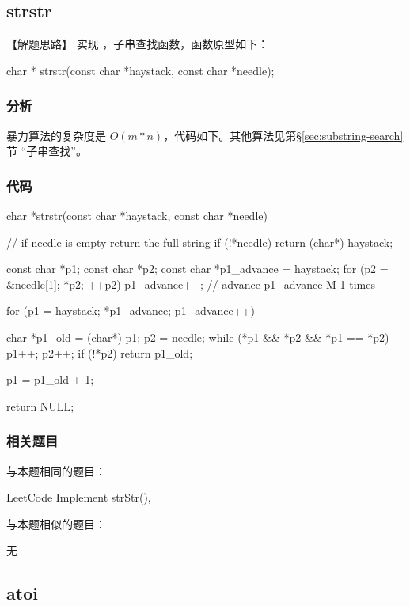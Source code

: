 \subsection{strstr}


【解题思路】
实现 ，子串查找函数，函数原型如下：
\begin{Code}
char * strstr(const char *haystack, const char *needle);
\end{Code}


\subsubsection{分析}
暴力算法的复杂度是 $O(m*n)$，代码如下。其他算法见第\S \ref{sec:substring-search}节 “子串查找”。


\subsubsection{代码}
\begin{Code}
char *strstr(const char *haystack, const char *needle) {
    // if needle is empty return the full string
    if (!*needle) return (char*) haystack;

    const char *p1;
    const char *p2;
    const char *p1_advance = haystack;
    for (p2 = &needle[1]; *p2; ++p2) {
        p1_advance++;   // advance p1_advance M-1 times
    }

    for (p1 = haystack; *p1_advance; p1_advance++) {
        char *p1_old = (char*) p1;
        p2 = needle;
        while (*p1 && *p2 && *p1 == *p2) {
            p1++;
            p2++;
        }
        if (!*p2) return p1_old;

        p1 = p1_old + 1;
    }
    return NULL;
}
\end{Code}


\subsubsection{相关题目}
与本题相同的题目：
\begindot
\item LeetCode Implement strStr(), 
\myenddot

与本题相似的题目：
\begindot
\item  无
\myenddot


\subsection{atoi}
\label{sec:string-to-integer}


